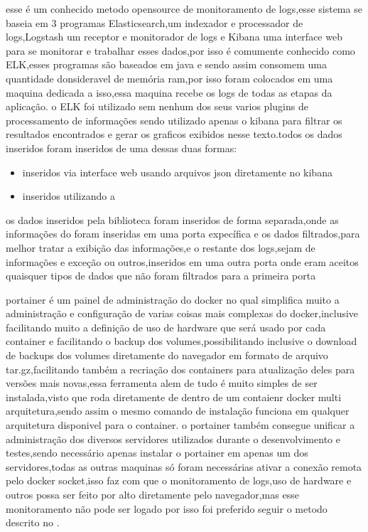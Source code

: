 \documentclass[
	12pt,				%
	openright,			%
	oneside,			%
	a4paper,			%
	english,			%
	french,				%
	spanish,			%
	brazil,				%
	]{abntex2}
\begin{document}
esse é um conhecido metodo opensource de monitoramento de logs,esse sistema se baseia em 3 programas Elasticsearch,um indexador e processador de logs,Logstash um receptor e monitorador de logs e Kibana uma interface web para se monitorar e trabalhar esses dados,por isso é comumente conhecido como ELK,esses programas são baseados em java e sendo assim consomem uma quantidade donsideravel de memória ram,por isso foram colocados em uma maquina dedicada a isso,essa maquina recebe os logs de todas as etapas da aplicação.
o ELK foi utilizado sem nenhum dos seus varios plugins de processamento de informações sendo utilizado apenas o kibana para filtrar os resultados encontrados e gerar os graficos exibidos nesse texto.todos os dados inseridos foram inseridos de uma dessas duas formas:
\cite{elk}
\begin{itemize}
 \item inseridos via interface web usando arquivos json diretamente no kibana
 \item inseridos utilizando a 
\end{itemize}
os dados inseridos pela biblioteca  foram inseridos de forma separada,onde as informações do  foram inseridas em uma porta expecífica e os dados filtrados,para melhor tratar a exibição das informações,e o restante dos logs,sejam de informações e exceção ou outros,inseridos em uma outra porta onde eram aceitos quaisquer tipos de dados que não foram filtrados para a primeira porta


portainer é um painel de administração do docker no qual simplifica muito a administração e configuração de varias coisas mais complexas do docker,inclusive facilitando muito a definição de uso de hardware que será usado por cada container e facilitando o backup dos volumes,possibilitando inclusive o download de backups dos volumes diretamente do navegador em formato de arquivo tar.gz,facilitando também a recriação dos containers para atualização deles para versões mais novas,essa ferramenta alem de tudo é muito simples de ser instalada,visto que roda diretamente de dentro de um contaienr docker multi arquitetura,sendo assim o mesmo comando de instalação funciona em qualquer arquitetura disponivel para o container.
o portainer também consegue unificar a administração dos diversos servidores utilizados durante o desenvolvimento e testes,sendo necessário apenas instalar o portainer em apenas um dos servidores,todas as outras maquinas só foram necessárias ativar a conexão remota pelo docker socket,isso faz com que o monitoramento de logs,uso de hardware e outros possa ser feito por alto diretamente pelo navegador,mas esse monitoramento não pode ser logado por isso foi preferido seguir o metodo descrito no .
\cite{portainer}
\end{document}
